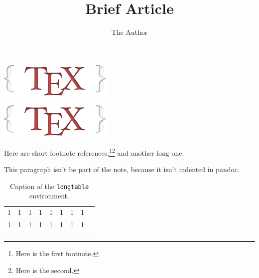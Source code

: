 \documentclass[twoside]{article}
\title{Brief Article}
\author{The Author}
\let\oldfigure\figure%
\let\endoldfigure\endfigure
\renewenvironment{figure}[1][]{%
  \oldfigure[#1]\begin{margincap}}{%
  \end{margincap}\endoldfigure}
\begin{document}
\maketitle

\lipsum[1-2]

\begin{figure}[htbp]
  \centering
  \includegraphics{./logo.png}
  \caption{An image and a caption}
\end{figure}

\lipsum[3-4]

\begin{figure}[htbp]
\centering
\includegraphics{./logo.png}
\caption{Same image again, in standard pandoc output. It comes from the \TeX\ Stack Exchange. It has such a long caption that it spills to two lines even in the main \texttt{textwidth} section.}
\end{figure}

\lipsum[5-6]

Here are short footnote references,\footnote{Here is the first footnote.}\footnote{Here is the second.} and another long one.%
%
%

This paragraph isn't be part of the note, because it isn't indented in pandoc.

\begin{longtable}{rrrrrrrrr}
    1 & 1 & 1 & 1 & 1 & 1 & 1 & 1 \\
    1 & 1 & 1 & 1 & 1 & 1 & 1 & 1 \\
    \caption{Caption of the \texttt{longtable} environment.}
    \label{longtable}
\end{longtable}

\lipsum[7-8]
\end{document}
